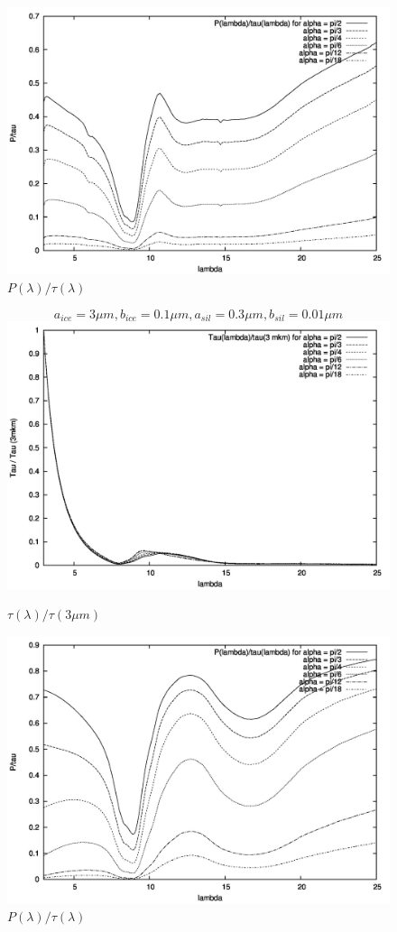 \documentclass[a4paper,10pt]{article}
\begin{document}
\begin{figure}[p]
 \includegraphics{../plots/P-to-tau-1-03.jpg}
 \caption{$P(\lambda)/\tau(\lambda)$ }
\end{figure}

\begin{figure}[p]
$$a_{ice} = 3 \mu m,b_{ice} = 0.1 \mu m , a_{sil} = 0.3 \mu m , b_{sil} = 0.01  \mu m $$
 \includegraphics{../plots/tau-3-01.jpg}
 \caption{$\tau(\lambda)/\tau(3\mu m)$ }
\end{figure}

\begin{figure}[p]
 \includegraphics{../plots/P-to-tau-3-01.jpg}
 \caption{$P(\lambda)/\tau(\lambda)$ }
\end{figure}

\end{document}
